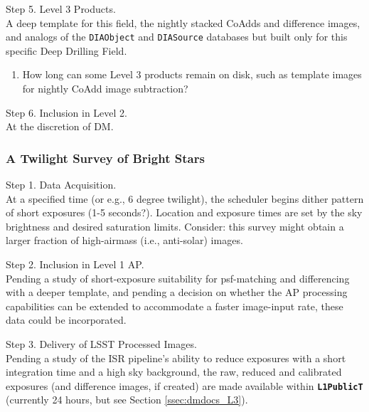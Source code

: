 \documentclass[DM,lsstdraft,toc]{lsstdoc}
\begin{document}
Step 5. Level 3 Products. \\ A deep template for this field, the nightly stacked CoAdds and difference images, and analogs of the {\tt DIAObject} and {\tt DIASource} databases but built only for this specific Deep Drilling Field.
\begin{enumerate}[resume,topsep=-10pt,label= \textbf{Concern \Roman*.}] \item \label{C17} How long can some Level 3 products remain on disk, such as template images for nightly CoAdd image subtraction? \end{enumerate}

Step 6. Inclusion in Level 2. \\ At the discretion of DM.


\subsubsection{A Twilight Survey of Bright Stars}

Step 1. Data Acquisition. \\ At a specified time (or e.g., 6 degree twilight), the scheduler begins dither pattern of short exposures (1-5 seconds?). Location and exposure times are set by the sky brightness and desired saturation limits. Consider: this survey might obtain a larger fraction of high-airmass (i.e., anti-solar) images.

Step 2. Inclusion in Level 1 AP. \\ Pending a study of short-exposure suitability for psf-matching and differencing with a deeper template, and pending a decision on whether the AP processing capabilities can be extended to accommodate a faster image-input rate, these data could be incorporated.

Step 3. Delivery of LSST Processed Images. \\ Pending a study of the ISR pipeline's ability to reduce exposures with a short integration time and a high sky background, the raw, reduced and calibrated exposures (and difference images, if created) are made available within {\tt \textbf{L1PublicT}} (currently 24 hours, but see Section \ref{ssec:dmdocs_L3}).
\end{document}
